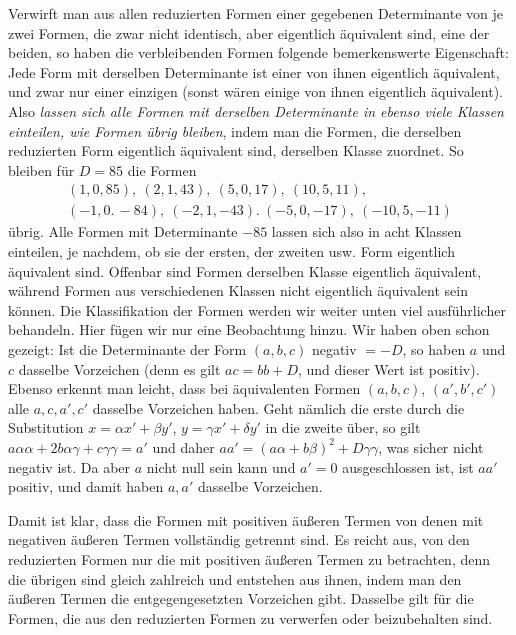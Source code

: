 Verwirft man aus allen reduzierten Formen einer gegebenen Determinante von je zwei Formen, die zwar nicht identisch, aber eigentlich äquivalent sind, eine der beiden, so haben die verbleibenden Formen folgende bemerkenswerte Eigenschaft: Jede Form mit derselben Determinante ist einer von ihnen eigentlich äquivalent, und zwar nur einer einzigen (sonst wären einige von ihnen eigentlich äquivalent). Also \emph{lassen sich alle Formen mit derselben Determinante in ebenso viele Klassen einteilen, wie Formen übrig bleiben}, indem man die Formen, die derselben reduzierten Form eigentlich äquivalent sind, derselben Klasse zuordnet. So bleiben für $D=85$ die Formen
\[
\begin{gathered}
(1,0,85),\ (2,1,43),\ (5,0,17),\ (10,5,11),\\
(-1,0.\,-84),\ (-2,1,-43).\ (-5,0,-17),\ (-10,5,-11)
\end{gathered}
\]
übrig. Alle Formen mit Determinante $-85$ lassen sich also in acht Klassen einteilen, je nachdem, ob sie der ersten, der zweiten usw. Form eigentlich äquivalent sind. Offenbar sind Formen derselben Klasse eigentlich äquivalent, während Formen aus verschiedenen Klassen nicht eigentlich äquivalent sein können. Die Klassifikation der Formen werden wir weiter unten viel ausführlicher behandeln. Hier fügen wir nur eine Beobachtung hinzu. Wir haben oben schon gezeigt: Ist die Determinante der Form $(a,b,c)$ negativ $=-D$, so haben $a$ und $c$ dasselbe Vorzeichen (denn es gilt $ac=bb+D$, und dieser Wert ist positiv). Ebenso erkennt man leicht, dass bei äquivalenten Formen $(a,b,c)$, $(a',b',c')$ alle $a,c,a',c'$ dasselbe Vorzeichen haben. Geht nämlich die erste durch die Substitution $x=\alpha x'+\beta y'$, $y=\gamma x'+\delta y'$ in die zweite über, so gilt $a\alpha\alpha+2b\alpha\gamma+c\gamma\gamma=a'$ und daher $aa'=(a\alpha+b\beta)^2+D\gamma\gamma$, was sicher nicht negativ ist. Da aber $a$ nicht null sein kann und $a'=0$ ausgeschlossen ist, ist $aa'$ positiv, und damit haben $a,a'$ dasselbe Vorzeichen.

Damit ist klar, dass die Formen mit positiven äußeren Termen von denen mit negativen äußeren Termen vollständig getrennt sind. Es reicht aus, von den reduzierten Formen nur die mit positiven äußeren Termen zu betrachten, denn
die übrigen sind gleich zahlreich und entstehen aus ihnen, indem man den äußeren Termen die entgegengesetzten Vorzeichen gibt. Dasselbe gilt für die Formen, die aus den reduzierten Formen zu verwerfen oder beizubehalten sind.

